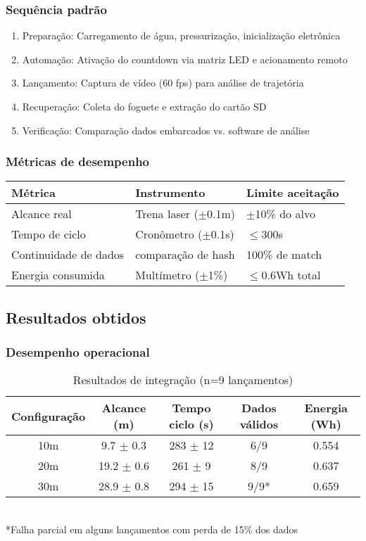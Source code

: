 \subsubsection{Sequência padrão}
\begin{enumerate}
    \item Preparação: Carregamento de água, pressurização, inicialização eletrônica
    \item Automação: Ativação do countdown via matriz LED e acionamento remoto
    \item Lançamento: Captura de vídeo (60 fps) para análise de trajetória
    \item Recuperação: Coleta do foguete e extração do cartão SD
    \item Verificação: Comparação dados embarcados vs. software de análise
\end{enumerate}

\subsubsection{Métricas de desempenho}
\begin{table}[H]
    \centering
    \begin{tabular}{|l|l|l|}
        \hline
        Métrica & Instrumento & Limite aceitação \\
        \hline
        Alcance real & Trena laser ($\pm$0.1m) & $\pm$10\% do alvo \\
        Tempo de ciclo & Cronômetro ($\pm$0.1s) & $\leq$300s \\
        Continuidade de dados & comparação de hash & 100\% de match \\
        Energia consumida & Multímetro ($\pm$1\%) & $\leq$0.6Wh total \\
        \hline
    \end{tabular}
\end{table}

\subsection{Resultados obtidos}
\subsubsection{Desempenho operacional}
\begin{table}[H]
    \centering
    \caption{Resultados de integração (n=9 lançamentos)}
    \begin{tabular}{|c|c|c|c|c|}
        \hline
        Configuração & Alcance (m) & Tempo ciclo (s) & Dados válidos & Energia (Wh) \\
        \hline
        10m & 9.7 $\pm$ 0.3 & 283 $\pm$ 12 & 6/9 & 0.554 \\
        20m & 19.2 $\pm$ 0.6 & 261 $\pm$ 9 & 8/9 & 0.637 \\
        30m & 28.9 $\pm$ 0.8 & 294 $\pm$ 15 & 9/9* & 0.659 \\
        \hline
    \end{tabular} \\
    *Falha parcial em alguns lançamentos com perda de 15\% dos dados
\end{table}


